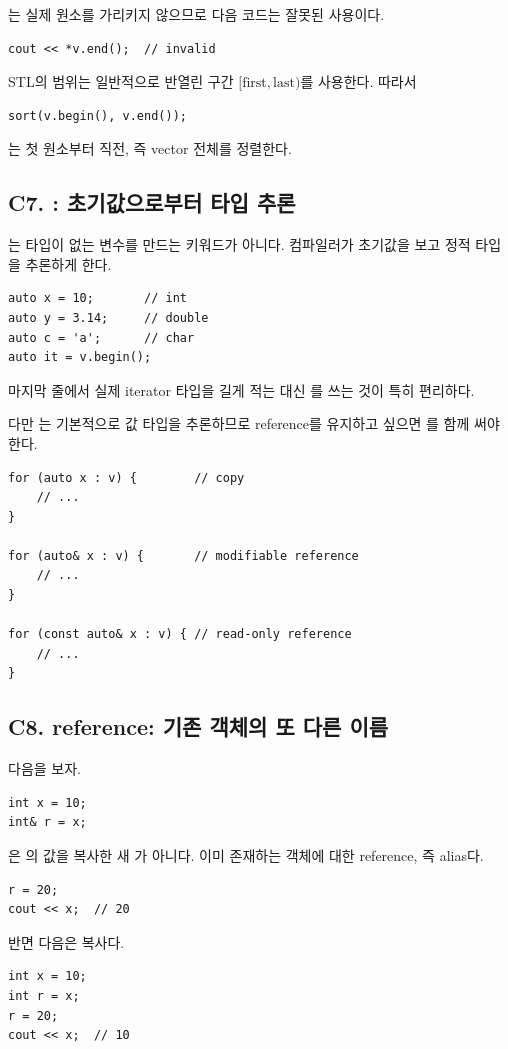 는 실제 원소를 가리키지 않으므로 다음 코드는 잘못된 사용이다.
\begin{lstlisting}
cout << *v.end();  // invalid
\end{lstlisting}

STL의 범위는 일반적으로 반열린 구간 $[\text{first},\text{last})$를 사용한다. 따라서
\begin{lstlisting}
sort(v.begin(), v.end());
\end{lstlisting}
는 첫 원소부터  직전, 즉 vector 전체를 정렬한다.

\subsection{C7. : 초기값으로부터 타입 추론}
는 타입이 없는 변수를 만드는 키워드가 아니다. 컴파일러가 초기값을 보고 정적 타입을 추론하게 한다.
\begin{lstlisting}
auto x = 10;       // int
auto y = 3.14;     // double
auto c = 'a';      // char
auto it = v.begin();
\end{lstlisting}

마지막 줄에서 실제 iterator 타입을 길게 적는 대신 를 쓰는 것이 특히 편리하다.

다만 는 기본적으로 값 타입을 추론하므로 reference를 유지하고 싶으면 \code{\&}를 함께 써야 한다.
\begin{lstlisting}
for (auto x : v) {        // copy
    // ...
}

for (auto& x : v) {       // modifiable reference
    // ...
}

for (const auto& x : v) { // read-only reference
    // ...
}
\end{lstlisting}

\subsection{C8. reference: 기존 객체의 또 다른 이름}
다음을 보자.
\begin{lstlisting}
int x = 10;
int& r = x;
\end{lstlisting}

은 의 값을 복사한 새 가 아니다. 이미 존재하는  객체에 대한 reference, 즉 alias다.
\begin{lstlisting}
r = 20;
cout << x;  // 20
\end{lstlisting}

반면 다음은 복사다.
\begin{lstlisting}
int x = 10;
int r = x;
r = 20;
cout << x;  // 10
\end{lstlisting}

